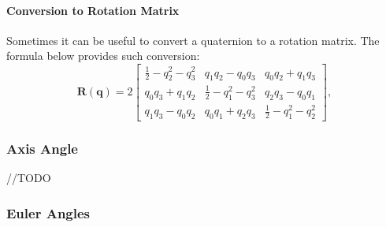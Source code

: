 \paragraph{Conversion to Rotation Matrix}
Sometimes it can be useful to convert a quaternion to a rotation matrix. The formula below provides such conversion: 
\begin{equation}
\mathbf{R}(\mathbf{q}) = 2
\left[
\begin{array}{ccc}
\frac{1}{2} - q^2_2 - q^2_3 & q_1q_2-q_0q_3 & q_0q_2+q_1q_3 \\

q_0q_3+q_1q_2 & \frac{1}{2} - q^2_1 - q^2_3 &   q_2q_3-q_0q_1\\

q_1q_3-q_0q_2 & q_0q_1+q_2q_3 & \frac{1}{2} - q^2_1 - q^2_2
\end{array}
\right],
\end{equation}


\subsubsection{Axis Angle}
//TODO

\subsubsection{Euler Angles}

